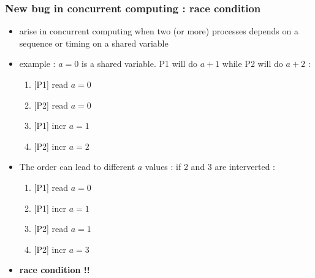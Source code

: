 \begin{frame}[containsverbatim]
\frametitle{New bug in concurrent computing : race condition}
\begin{itemize}
	\item{arise in concurrent computing when two (or more) processes depends on a sequence or timing on a shared variable}
	\item{example : $a = 0$ is a shared variable. P1 will do $a+1$ while P2 will do $a+2$ : 
		\begin{enumerate}
			\item{[P1] read $a = 0$}
			\item{[P2] read $a = 0$}
			\item{[P1] incr $a = 1$}
			\item{[P2] incr $a = 2$}
		\end{enumerate}
		}
	\item{The order can lead to different $a$ values : if 2 and 3 are interverted :
		\begin{enumerate}
			\item{[P1] read $a = 0$}
			\item{[P1] incr $a = 1$}
			\item{[P2] read $a = 1$}
			\item{[P2] incr $a = 3$}
		\end{enumerate}
	}
	\item{\textbf{race condition !!}}
\end{itemize}

\end{frame}





